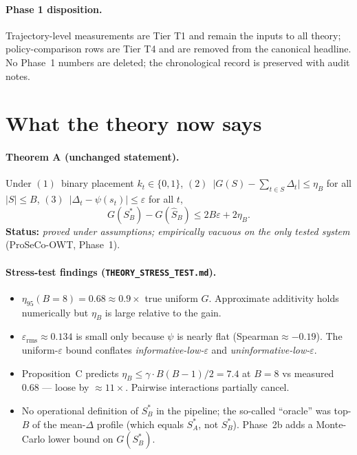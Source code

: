\documentclass[11pt,a4paper]{article}
\newcommand{\Sopt}{S_B^{*}}
\newcommand{\Shat}{\widehat{S}_B}
\newcommand{\eps}{\varepsilon}
\begin{document}
\paragraph{Phase 1 disposition.} Trajectory-level measurements are Tier T1 and
remain the inputs to all theory; policy-comparison rows are Tier T4 and are
removed from the canonical headline. No Phase~1 numbers are deleted; the
chronological record is preserved with audit notes.

\section{What the theory now says}

\paragraph{Theorem A (unchanged statement).} Under
$(1)$~binary placement $k_t \in \{0,1\}$,
$(2)$~$\bigl|G(S) - \sum_{t\in S}\Delta_t\bigr| \le \eta_B$ for all $|S|\le B$,
$(3)$~$|\Delta_t - \psi(s_t)| \le \eps$ for all $t$,
\[
  G(\Sopt) - G(\Shat) \le 2 B \eps + 2 \eta_B .
\]
\textbf{Status:} \emph{proved under assumptions; empirically vacuous on the only
tested system} (ProSeCo-OWT, Phase~1).

\paragraph{Stress-test findings (\texttt{THEORY\_STRESS\_TEST.md}).}
\begin{itemize}[leftmargin=1.4em, itemsep=0pt]
  \item $\eta_{95}(B{=}8) = 0.68 \approx 0.9 \times $ true uniform $G$. Approximate
    additivity holds numerically but $\eta_B$ is large relative to the gain.
  \item $\eps_{\mathrm{rms}} \approx 0.134$ is small only because $\psi$ is nearly
    flat (Spearman${\approx}-0.19$). The uniform-$\eps$ bound conflates
    \emph{informative-low-$\eps$} and \emph{uninformative-low-$\eps$}.
  \item Proposition~C predicts $\eta_B \le \gamma{\cdot}B(B{-}1)/2 = 7.4$ at
    $B{=}8$ vs measured $0.68$ --- loose by ${\approx}11{\times}$. Pairwise
    interactions partially cancel.
  \item No operational definition of $\Sopt$ in the pipeline; the so-called
    ``oracle'' was top-$B$ of the mean-$\Delta$ profile (which equals $S_A^*$,
    not $\Sopt$). Phase~2b adds a Monte-Carlo lower bound on $G(\Sopt)$.
\end{itemize}
\end{document}
